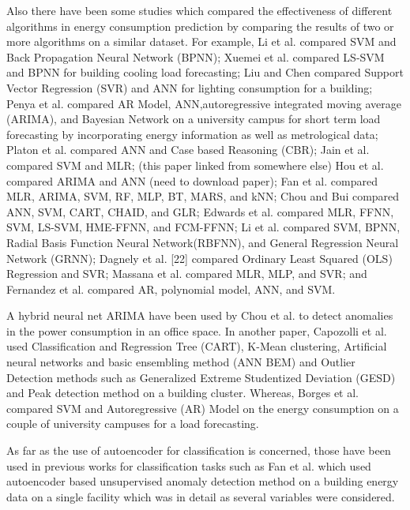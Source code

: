 \documentclass[conference]{IEEEtran}
\begin{document}
Also there have been some studies which compared the effectiveness of different algorithms in energy consumption prediction by comparing the results of two or more algorithms on a similar dataset. For example, Li et al. \cite{bb8} compared SVM and Back Propagation Neural Network (BPNN); %
 Xuemei et al. \cite{bb12}  compared LS-SVM and BPNN for building cooling load forecasting; Liu and Chen \cite{bb13}  compared Support Vector Regression (SVR) and ANN for lighting consumption for a building; Penya et al. \cite{bb14}  compared AR Model, ANN,autoregressive integrated moving average (ARIMA), and Bayesian Network on a university campus for short term load forecasting by incorporating energy information as well as metrological data; Platon et al. \cite{bb15}  compared ANN and Case based Reasoning (CBR); Jain et al. \cite{bb16} compared SVM and MLR; (this paper linked from somewhere else) Hou et al. \cite{bb17}  compared ARIMA and ANN (need to download paper);  Fan et al. \cite{bb18}  compared MLR, ARIMA, SVM, RF, MLP, BT, MARS, and kNN; Chou and Bui \cite{bb19}  compared ANN, SVM, CART, CHAID, and GLR; Edwards et al. \cite{bb20}  compared MLR, FFNN, SVM, LS-SVM, HME-FFNN, and FCM-FFNN; Li et al. \cite{bb21,bb22} compared SVM, BPNN, Radial Basis Function Neural Network(RBFNN), and General Regression Neural Network (GRNN); Dagnely et al. \cite{bb23} [22] compared Ordinary Least Squared (OLS) Regression and SVR; Massana et al. \cite{bb24} compared MLR, MLP, and SVR; and Fernandez et al. \cite{bb25}  compared AR, polynomial model, ANN, and SVM.

A hybrid neural net ARIMA have been used by Chou et al.\cite{bb29} to detect anomalies in the power consumption in an office space. In another paper, Capozolli et al. \cite{bb30} used Classification and Regression Tree (CART), K-Mean clustering, Artificial neural networks and basic ensembling method (ANN BEM) and Outlier Detection methods such as Generalized Extreme Studentized Deviation (GESD) and Peak detection method on a building cluster. Whereas, Borges et al. \cite{bb11} compared SVM and Autoregressive (AR) Model on the energy consumption on a couple of university campuses for a load forecasting. 






As far as the use of autoencoder for classification is concerned, those have been used in previous works for classification tasks such as Fan et al.\cite{bb26} which used autoencoder based unsupervised anomaly detection method on a building energy data on a single facility which was in detail as several variables were considered.
\end{document}
